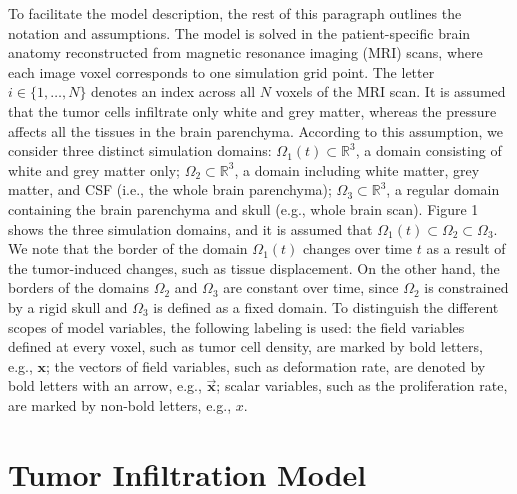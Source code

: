 \documentclass[12pt]{article}
\newcommand{\bx}{\mathbf{x}}
\begin{document}
To facilitate the model description, the rest of this paragraph outlines the notation and assumptions. The model is solved in the patient-specific brain anatomy reconstructed from magnetic resonance imaging (MRI) scans, where each image voxel corresponds to one simulation grid point. The letter \( i \in \{1, \ldots, N\} \) denotes an index across all \( N \) voxels of the MRI scan. It is assumed that the tumor cells infiltrate only white and grey matter, whereas the pressure affects all the tissues in the brain parenchyma. According to this assumption, we consider three distinct simulation domains: \( \Omega_1(t) \subset \mathbb{R}^3 \), a domain consisting of white and grey matter only; \( \Omega_2 \subset \mathbb{R}^3 \), a domain including white matter, grey matter, and CSF (i.e., the whole brain parenchyma); \( \Omega_3 \subset \mathbb{R}^3 \), a regular domain containing the brain parenchyma and skull (e.g., whole brain scan). Figure 1 shows the three simulation domains, and it is assumed that \( \Omega_1(t) \subset \Omega_2 \subset \Omega_3 \). We note that the border of the domain \( \Omega_1(t) \) changes over time \( t \) as a result of the tumor-induced changes, such as tissue displacement. On the other hand, the borders of the domains \( \Omega_2 \) and \( \Omega_3 \) are constant over time, since \( \Omega_2 \) is constrained by a rigid skull and \( \Omega_3 \) is defined as a fixed domain. To distinguish the different scopes of model variables, the following labeling is used: the field variables defined at every voxel, such as tumor cell density, are marked by bold letters, e.g., \(\bx\); the vectors of field variables, such as deformation rate, are denoted by bold letters with an arrow, e.g., \(\vec{\bx}\); scalar variables, such as the proliferation rate, are marked by non-bold letters, e.g., \( x \). 



\section{Tumor Infiltration Model}
\label{sec:model-inftr}
\end{document}

